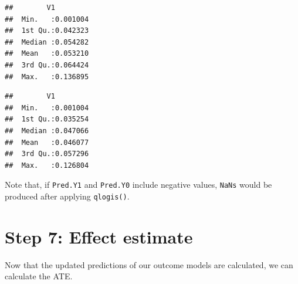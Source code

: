 \documentclass[
]{book}
\newenvironment{Shaded}{\begin{snugshade}}{\end{snugshade}}
\newcommand{\FunctionTok}[1]{\textcolor[rgb]{0.00,0.00,0.00}{#1}}
\newcommand{\NormalTok}[1]{#1}
\newcommand{\OtherTok}[1]{\textcolor[rgb]{0.56,0.35,0.01}{#1}}
\newcommand{\SpecialCharTok}[1]{\textcolor[rgb]{0.00,0.00,0.00}{#1}}
\begin{document}
\begin{Shaded}
\end{Shaded}

\begin{verbatim}
##        V1          
##  Min.   :0.001004  
##  1st Qu.:0.042323  
##  Median :0.054282  
##  Mean   :0.053210  
##  3rd Qu.:0.064424  
##  Max.   :0.136895
\end{verbatim}

\begin{Shaded}
\end{Shaded}

\begin{verbatim}
##        V1          
##  Min.   :0.001004  
##  1st Qu.:0.035254  
##  Median :0.047066  
##  Mean   :0.046077  
##  3rd Qu.:0.057296  
##  Max.   :0.126804
\end{verbatim}

Note that, if \texttt{Pred.Y1} and \texttt{Pred.Y0} include negative values, \texttt{NaNs} would be produced after applying \texttt{qlogis()}.

\hypertarget{step-7-effect-estimate}{%
\section{Step 7: Effect estimate}\label{step-7-effect-estimate}}

Now that the updated predictions of our outcome models are calculated, we can calculate the ATE.
\end{document}
